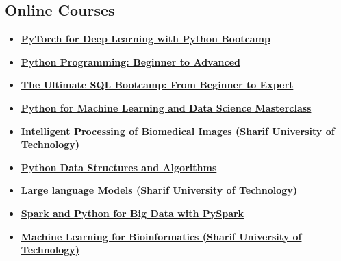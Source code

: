 \documentclass[11pt,a4paper,sans]{moderncv} %
\newcommand*{\authorimg}[1]{%
	\raisebox{-.3\baselineskip}{%
		\texttt{[image: \#1]}%
	}%
}
\begin{document}
\subsection{Online Courses}
\begin{itemize}
    \item \authorimg{Images/torch.png} \href{https://www.udemy.com/course/pytorch-for-deep-learning-with-python-bootcamp/}{\textbf{PyTorch for Deep Learning with Python Bootcamp}}

    \item \authorimg{Images/python.png} \href{https://www.pytopia.ai/courses/python-programming-beginner-to-advanced}{\textbf{Python Programming: Beginner to Advanced}}

    \item \authorimg{Images/Postgresql_logo.svg.png} \href{https://www.udemy.com/course/the-complete-sql-bootcamp/}{\textbf{The Ultimate SQL Bootcamp: From Beginner to Expert}}

    \item \authorimg{Images/ml.png} \href{https://www.udemy.com/course/python-for-machine-learning-data-science-masterclass/}{\textbf{Python for Machine Learning and Data Science Masterclass}}

    \item \authorimg{Images/ml.png} \href{https://ocw.sharif.ir/course/id/527}{\textbf{Intelligent Processing of Biomedical Images (Sharif University of Technology)}}

    \item \authorimg{Images/data_structure_logo.png} \href{https://www.udemy.com/course/data-structures-algorithms-python/}{\textbf{Python Data Structures and Algorithms}}

    \item \authorimg{Images/torch.png} \href{https://ocw.sharif.ir/course/id/524}{\textbf{Large language Models (Sharif University of Technology)}}

    \item \authorimg{Images/spark_logo.png} \href{https://www.udemy.com/course/spark-and-python-for-big-data-with-pyspark/}{\textbf{Spark and Python for Big Data with PySpark}}

    \item \authorimg{Images/ml.png} \href{https://maktabkhooneh.org/course/%D8%A2%D9%85%D9%88%D8%B2%D8%B4-%D8%B1%D8%A7%DB%8C%DA%AF%D8%A7%D9%86-%DB%8C%D8%A7%D8%AF%DA%AF%DB%8C%D8%B1%DB%8C-%D9%85%D8%A7%D8%B4%DB%8C%D9%86-%D8%A8%DB%8C%D9%88%D8%A7%D9%86%D9%81%D9%88%D8%B1%D9%85%D8%A7%D8%AA%DB%8C%DA%A9-mk663/#chapter}{\textbf{Machine Learning for Bioinformatics (Sharif University of Technology)}}
\end{itemize}
\end{document}
